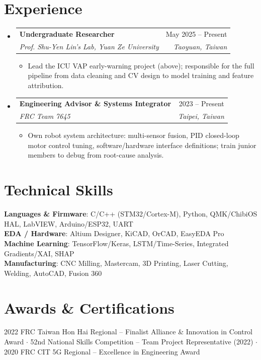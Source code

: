 \documentclass[letterpaper,11pt]{article}
\makeatletter
\newcommand{\resumeItem}[1]{
  \item\small{
    {#1 \vspace{-2pt}}
  }
}
\newcommand{\resumeSubheading}[4]{
  \vspace{-2pt}\item
    \begin{tabular*}{0.97\textwidth}[t]{l@{\extracolsep{\fill}}r}
      \textbf{#1} & #2 \\
      \textit{\small#3} & \textit{\small #4} \\
    \end{tabular*}\vspace{-7pt}
}
\newcommand{\resumeSubHeadingListStart}{\begin{itemize}[leftmargin=0.0in, label={}]}
\newcommand{\resumeSubHeadingListEnd}{\end{itemize}}
\newcommand{\resumeItemListStart}{\begin{itemize}[leftmargin=*, itemsep=0pt, topsep=2pt]}
\newcommand{\resumeItemListEnd}{\end{itemize}\vspace{-5pt}}
\makeatother
\begin{document}
\section{Experience}
  \resumeSubHeadingListStart
    \resumeSubheading
      {Undergraduate Researcher}{May 2025 -- Present}
      {Prof. Shu-Yen Lin's Lab, Yuan Ze University}{Taoyuan, Taiwan}
      \resumeItemListStart
        \resumeItem{Lead the ICU VAP early-warning project (above); responsible for the full pipeline from data cleaning and CV design to model training and feature attribution.}
      \resumeItemListEnd
    \resumeSubheading
      {Engineering Advisor \& Systems Integrator}{2023 -- Present}
      {FRC Team 7645}{Taipei, Taiwan}
      \resumeItemListStart
        \resumeItem{Own robot system architecture: multi-sensor fusion, PID closed-loop motor control tuning, software/hardware interface definitions; train junior members to debug from root-cause analysis.}
      \resumeItemListEnd
  \resumeSubHeadingListEnd

\section{Technical Skills}
 \begin{itemize}[leftmargin=0.0in, label={}]
    \small{\item{
     \textbf{Languages \& Firmware}{: C/C++ (STM32/Cortex-M), Python, QMK/ChibiOS HAL, LabVIEW, Arduino/ESP32, UART} \\
     \textbf{EDA / Hardware}{: Altium Designer, KiCAD, OrCAD, EasyEDA Pro} \\
     \textbf{Machine Learning}{: TensorFlow/Keras, LSTM/Time-Series, Integrated Gradients/XAI, SHAP} \\
     \textbf{Manufacturing}{: CNC Milling, Mastercam, 3D Printing, Laser Cutting, Welding, AutoCAD, Fusion 360} \\
    }}
 \end{itemize}

\section{Awards \& Certifications}
 \begin{itemize}[leftmargin=0.0in, label={}]
    \small{\item{
     2022 FRC Taiwan Hon Hai Regional -- Finalist Alliance \& Innovation in Control Award $\cdot$
     52nd National Skills Competition -- Team Project Representative (2022) $\cdot$
     2020 FRC CIT 5G Regional -- Excellence in Engineering Award
    }}
 \end{itemize}
\end{document}
